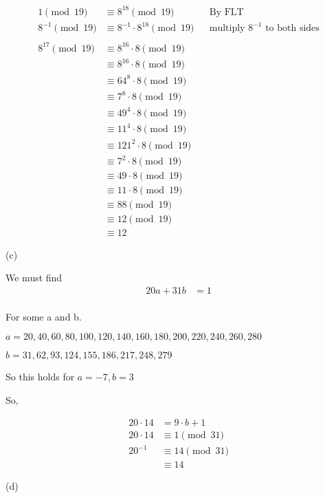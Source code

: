 \begin{solution}
\begin{align*}
1 \pmod{19} &\equiv 8^{18} \pmod{19}&& \text{By FLT}\\
8^{-1} \pmod{19} &\equiv 8^{-1} \cdot 8^{18} \pmod{19} && \text{multiply $8^{-1}$ to both sides}\\
\\
8^{17} \pmod{19} &\equiv 8^{16} \cdot 8 \pmod{19} \\
&\equiv 8^{16} \cdot 8 \pmod{19} \\
&\equiv 64^{8} \cdot 8 \pmod{19} \\
&\equiv 7^{8} \cdot 8 \pmod{19} \\
&\equiv 49^{4} \cdot 8 \pmod{19} \\
&\equiv 11^{4} \cdot 8 \pmod{19} \\
&\equiv 121^{2} \cdot 8 \pmod{19} \\
&\equiv 7^{2} \cdot 8 \pmod{19} \\
&\equiv 49 \cdot 8 \pmod{19} \\
&\equiv 11 \cdot 8 \pmod{19} \\
&\equiv 88 \pmod{19} \\
&\equiv 12 \pmod{19} \\
&\equiv 12 
\end{align*}

(c)

We must find
\begin{align*}
20a + 31b &= 1\\
\end{align*}

For some a and b.

$a = {20, 40, 60, 80, 100, 120, 140, 160, 180, 200, 220, 240, 260, 280}$

$b = {31, 62, 93, 124, 155, 186, 217, 248, 279}$

So this holds for $a=-7, b=3$

So, 

\begin{align*}
20 \cdot 14 &= 9 \cdot b + 1 \\
20 \cdot 14 &\equiv 1 \pmod{31} \\
20^{-1} &\equiv 14 \pmod{31} \\
&\equiv 14 
\end{align*}

(d)


\end{solution}
